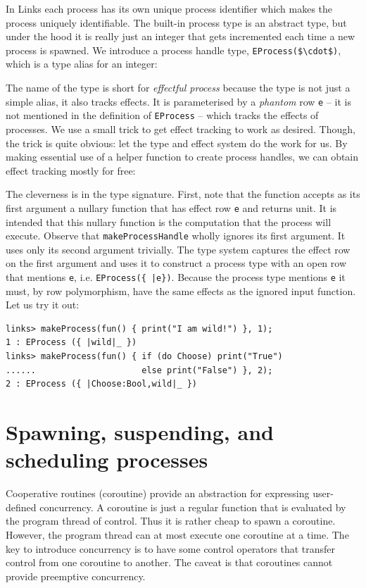 \documentclass[12pt,mscres,cdtppar,twoside,openright,logo,rightchapter,normalheadings]{infthesis}
\newcommand{\snippet}[1]{}
\theoremstyle{definition}
\begin{document}
In Links each process has its own unique process identifier which
makes the process uniquely identifiable. The built-in process type is
an abstract type, but under the hood it is really just an integer that
gets incremented each time a new process is spawned. We introduce a
process handle type, \lstinline[mathescape]!EProcess($\cdot$)!, which
is a type alias for an integer:
%
\snippet{eprocess.links}
%
The name of the type is short for \emph{effectful process} because the
type is not just a simple alias, it also tracks effects. It is
parameterised by a \emph{phantom} row \lstinline$e$ -- it is not
mentioned in the definition of \lstinline$EProcess$ -- which tracks
the effects of processes. We use a small trick to get effect tracking
to work as desired. Though, the trick is quite obvious: let the type
and effect system do the work for us. By making essential use of a
helper function to create process handles, we can obtain effect
tracking mostly for free:
%
\snippet{makeProcess.links}
%
The cleverness is in the type signature. First, note that the function
accepts as its first argument a nullary function that has effect row
\lstinline$e$ and returns unit. It is intended that this nullary
function is the computation that the process will execute. Observe
that \lstinline$makeProcessHandle$ wholly ignores its first
argument. It uses only its second argument trivially. The type system
captures the effect row on the first argument and uses it to construct
a process type with an open row that mentions \lstinline$e$, i.e.
\lstinline$EProcess({ |e})$. Because the process type mentions
\lstinline$e$ it must, by row polymorphism, have the same effects as
the ignored input function. Let us try it out:
%
\begin{lstlisting}
links> makeProcess(fun() { print("I am wild!") }, 1);
1 : EProcess ({ |wild|_ })
links> makeProcess(fun() { if (do Choose) print("True") 
......                     else print("False") }, 2);
2 : EProcess ({ |Choose:Bool,wild|_ })
\end{lstlisting}
%

\section{Spawning, suspending, and scheduling processes}
\label{sec:links-model-handlers-scheduler}

Cooperative routines (coroutine) provide an abstraction for expressing
user-defined concurrency. A coroutine is just a regular function that
is evaluated by the program thread of control. Thus it is rather cheap
to spawn a coroutine. However, the program thread can at most execute
one coroutine at a time. The key to introduce concurrency is to have
some control operators that transfer control from one coroutine to
another. The caveat is that coroutines cannot provide preemptive
concurrency.
\end{document}
